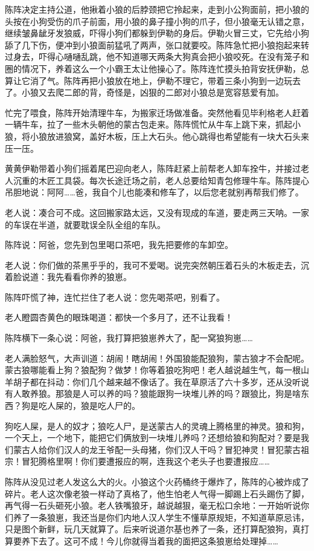 \par 陈阵决定主持公道，他揪着小狼的后脖颈把它拎起来，走到小公狗面前，把小狼的头按在小狗受伤的爪子前面，用小狼的鼻子撞小狗的爪子，但小狼毫无认错之意，继续皱鼻龇牙发狼威，吓得小狗们都躲到伊勒的身后。伊勒火冒三丈，它先给小狗舔了几下伤，便冲到小狼面前猛吼了两声，张口就要咬。陈阵急忙把小狼抱起来转过身去，吓得心嗵嗵乱跳，他不知道哪天两条大狗真会把小狼咬死。在没有笼子和圈的情况下，养着这么一个小霸王太让他操心了。陈阵连忙摸头拍背安抚伊勒，总算让它消了气。陈阵再把小狼放在地上，伊勒不理它，带着三条小狗到一边玩去了。小狼又去爬二郎的背，奇怪是，凶狠的二郎对小狼总是宽容慈爱有加。
\par 
\par 忙完了喂食，陈阵开始清理牛车，为搬家迁场做准备。突然他看见毕利格老人赶着一辆牛车，拉了一些木头朝他的蒙古包走来。陈阵慌忙从牛车上跳下来，抓起小狼，将小狼放进狼窝，盖好木板，压上大石头。他心跳得也希望能有一块大石头来压一压。
\par 黄黄伊勒带着小狗们摇着尾巴迎向老人，陈阵赶紧上前帮老人卸车拴牛，并接过老人沉重的木匠工具袋。每次长途迁场之前，老人总要给知青包修理牛车。陈阵提心吊胆地说：阿阿……爸，我自个儿也能凑和修车了，以后您老就别再帮我们修了。
\par 老人说：凑合可不成。这回搬家路太远，又没有现成的车道，要走两三天呐。一家的车误在半道，就要耽误全队全组的车队。
\par 陈阵说：阿爸，您先到包里喝口茶吧，我先把要修的车卸空。
\par 老人说：你们做的茶黑乎乎的，我可不爱喝。说完突然朝压着石头的木板走去，沉着脸说道：我先看看你养的狼崽。
\par 陈阵吓慌了神，连忙拦住了老人说：您先喝茶吧，别看了。
\par 老人瞪圆杏黄色的眼珠喝道：都快一个多月了，还不让我看！
\par 陈阵横下一条心说：阿爸，我打算把狼崽养大了，配一窝狼狗崽……
\par 老人满脸怒气，大声训道：胡闹！瞎胡闹！外国狼能配狼狗，蒙古狼才不会配呢。蒙古狼哪能看上狗？狼配狗？做梦！你等着狼吃狗吧！老人越说越生气，每一根山羊胡子都在抖动：你们几个越来越不像话了。我在草原活了六十多岁，还从没听说有人敢养狼。那狼是人可以养的吗？狼能跟狗一块堆儿养的吗？跟狼比，狗是啥东西？狗是吃人屎的，狼是吃人尸的。
\par 狗吃人屎，是人的奴才；狼吃人尸，是送蒙古人的灵魂上腾格里的神灵。狼和狗，一个天上，一个地下，能把它们俩放到一块堆儿养吗？还想给狼和狗配对？要是我们蒙古人给你们汉人的龙王爷配一头母猪，你们汉人干吗？冒犯神灵！冒犯蒙古祖宗！冒犯腾格里啊！你们要遭报应的啊，连我这个老头子也要遭报应……
\par 陈阵从没见过老人发这么大的火。小狼这个火药桶终于爆炸了，陈阵的心被炸成了碎片。老人这次像老狼一样动了真格了，他生怕老人气得一脚踢上石头踢伤了脚，再气得一石头砸死小狼。老人铁嘴狼牙，越说越狠，毫无松口余地：一开始听说你们养了一条狼崽，我还当是你们内地人汉人学生不懂草原规矩，不知道草原忌讳，只是图个新鲜，玩几天就算了。后来听说道尔基也养了一条，还打算配狼狗，真打算要养下去了。这可不成！今儿你就得当着我的面把这条狼崽给处理掉……
